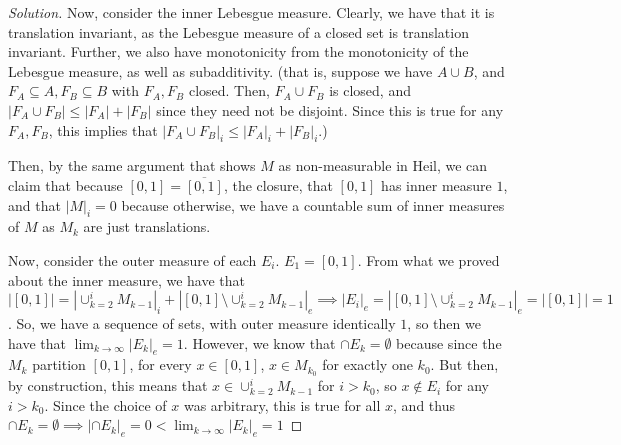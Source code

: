 \documentclass[10pt]{article}
\begin{document}
\begin{proof}[Solution]
Now, consider the inner Lebesgue measure. Clearly, we have that it is translation invariant, as the Lebesgue measure of a closed set is translation invariant. Further, we also have monotonicity from the monotonicity of the Lebesgue measure, as well as subadditivity. (that is, suppose we have $A \cup B$, and $F_A \subseteq A, F_B \subseteq B$ with $F_A, F_B$ closed. Then, $F_A \cup F_B$ is closed, and $|F_A \cup F_B| \leq |F_A| + |F_B|$ since they need not be disjoint. Since this is true for any $F_A, F_B$, this implies that $|F_A \cup F_B|_i \leq |F_A|_i + |F_B|_i$.)

Then, by the same argument that shows $M$ as non-measurable in Heil, we can claim that because $[0,1] = \overline{[0,1]}$, the closure, that $[0,1]$ has inner measure $1$, and that $|M|_i = 0$ because otherwise, we have a countable sum of inner measures of $M$ as $M_k$ are just translations.

Now, consider the outer measure of each $E_i$. $E_1 = [0,1]$. From what we proved about the inner measure, we have that $|[0,1]| = |\cup_{k=2}^i M_{k-1}|_i + |[0,1] \setminus\cup_{k=2}^i M_{k-1}|_e \implies  |E_i|_e = |[0,1] \setminus\cup_{k=2}^i M_{k-1}|_e = |[0,1]| = 1$. So, we have a sequence of sets, with outer measure identically $1$, so then we have that $\lim_{k \to \infty} |E_k|_e = 1$. However, we know that $\cap E_k = \emptyset$ because since the $M_k$ partition $[0,1]$, for every $x \in [0,1]$, $x \in M_{k_0}$ for exactly one $k_0$. But then, by construction, this means that $x \in \cup_{k=2}^i M_{k-1}$ for $i > k_0$, so $x \not \in E_i$ for any $i > k_0$. Since the choice of $x$ was arbitrary, this is true for all $x$, and thus  $\cap E_k = \emptyset \implies |\cap E_k|_e = 0 < \lim_{k \to \infty} |E_k|_e = 1$
\end{proof}
\end{document}
